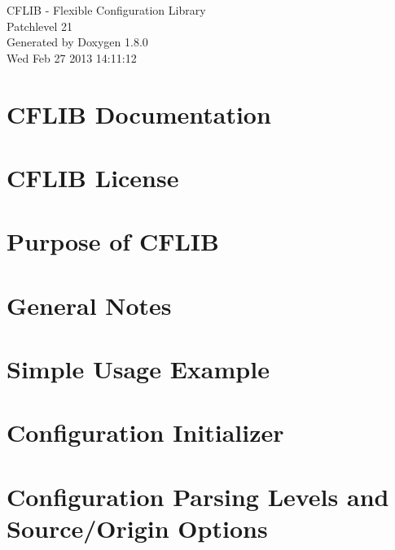 \documentclass{article}
\begin{document}
\hypersetup{pageanchor=false,citecolor=blue}
\begin{titlepage}
\vspace*{7cm}
\begin{center}
{\Large C\-F\-L\-I\-B -\/ Flexible Configuration Library \\[1ex]\large Patchlevel 21 }\\
\vspace*{1cm}
{\large Generated by Doxygen 1.8.0}\\
\vspace*{0.5cm}
{\small Wed Feb 27 2013 14:11:12}\\
\end{center}
\end{titlepage}
\tableofcontents
{}
\hypersetup{pageanchor=true,citecolor=blue}
\section{C\-F\-L\-I\-B Documentation}
\label{index}\hypertarget{index}{}
\section{C\-F\-L\-I\-B License}
\label{license}
\hypertarget{license}{}

\section{Purpose of C\-F\-L\-I\-B}
\label{purpose}
\hypertarget{purpose}{}

\section{General Notes}
\label{properties}
\hypertarget{properties}{}

\section{Simple Usage Example}
\label{simple_example}
\hypertarget{simple_example}{}

\section{Configuration Initializer}
\label{config_initializer}
\hypertarget{config_initializer}{}

\section{Configuration Parsing Levels and Source/\-Origin Options}
\label{config_levels}
\hypertarget{config_levels}{}

\end{document}

